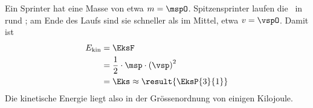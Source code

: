 Ein Sprinter hat eine Masse von etwa $m = \mspO$. Spitzensprinter laufen die \slaO\ in rund \tlaO; am Ende des Laufs sind sie schneller als im Mittel, etwa $v = \vspO$. Damit ist
\begin{align}
 E_\mathrm{kin} &= \EksF \\
   &= \frac{1}{2}\cdot\msp\cdot\left(\vsp\right)^2 \\
   &= \Eks \approx \result{\EksP{3}{1}}
\end{align}
Die kinetische Energie liegt also in der Grössenordnung von einigen Kilojoule.
